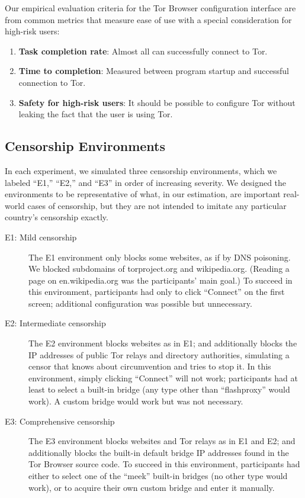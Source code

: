 \documentclass[USenglish,oneside,twocolumn]{article}
\begin{document}
Our empirical evaluation criteria for the Tor Browser configuration
interface are from common metrics that measure ease of use with a special 
consideration for high-risk users: \\

\begin{enumerate}
    \item {\bfseries Task completion rate}: Almost all can successfully connect to Tor.
    \item {\bfseries  Time to completion}: Measured between program startup and successful connection to Tor.
    \item {\bfseries Safety for high-risk users}: It should be possible to configure Tor without leaking the fact that the user is using Tor. 
\end{enumerate}

\subsection{Censorship Environments}
\label{sec:environments}
In each experiment, we simulated three censorship environments,
which we labeled ``E1,'' ``E2,'' and ``E3''
in order of increasing severity.
We designed the environments to be representative
of what, in our estimation, are important real-world
cases of censorship, but they are not intended to imitate
any particular country's censorship exactly.

\smallskip

\begin{description}
\item[E1: Mild censorship]
The E1 environment only blocks some websites,
as if by DNS poisoning.
We blocked subdomains of torproject.org
and wikipedia.org.
(Reading a page on en.wikipedia.org was the participants' main goal.)
To succeed in this environment,
participants had only to click ``Connect'' on the first screen;
additional configuration was possible but unnecessary.

\item[E2: Intermediate censorship]
The E2 environment blocks websites as in E1;
and additionally blocks the IP addresses of public Tor relays
and directory authorities, simulating a censor that knows
about circumvention and tries to stop it.
In this environment, simply clicking ``Connect'' will not work;
participants had at least to select a built-in bridge
(any type other than ``flashproxy'' would work).
A custom bridge would work but was not necessary.

\item[E3: Comprehensive censorship]
The E3 environment blocks websites and Tor relays as in E1 and E2;
and additionally blocks the built-in default bridge IP addresses
found in the Tor Browser source code.
To succeed in this environment, participants had either to select
one of the ``meek'' built-in bridges (no other type would work),
or to acquire their own custom bridge and enter it manually.
\end{description}
\end{document}
